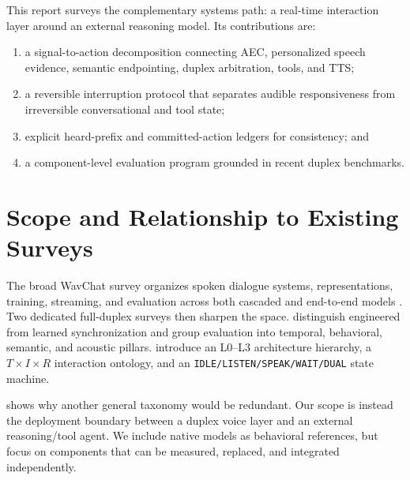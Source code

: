 \documentclass[11pt]{article}
\newcommand{\code}[1]{\texttt{#1}}
\begin{document}
This report surveys the complementary systems path: a real-time interaction
layer around an external reasoning model. Its contributions are:

\begin{enumerate}[leftmargin=*]
  \item a signal-to-action decomposition connecting AEC, personalized speech
        evidence, semantic endpointing, duplex arbitration, tools, and TTS;
  \item a reversible interruption protocol that separates audible responsiveness
        from irreversible conversational and tool state;
  \item explicit heard-prefix and committed-action ledgers for consistency; and
  \item a component-level evaluation program grounded in recent duplex
        benchmarks.
\end{enumerate}

\section{Scope and Relationship to Existing Surveys}

The broad WavChat survey organizes spoken dialogue systems, representations,
training, streaming, and evaluation across both cascaded and end-to-end models
\citep{ji2024wavchat}. Two dedicated full-duplex surveys then sharpen the
space. \citet{chen2025fdsurvey} distinguish engineered from learned
synchronization and group evaluation into temporal, behavioral, semantic, and
acoustic pillars. \citet{lu2026fdsurvey} introduce an L0--L3 architecture
hierarchy, a $T\times I\times R$ interaction ontology, and an
\code{IDLE/LISTEN/SPEAK/WAIT/DUAL} state machine.

 shows why another general taxonomy would be redundant. Our
scope is instead the deployment boundary between a duplex voice layer and an
external reasoning/tool agent. We include native models as behavioral
references, but focus on components that can be measured, replaced, and
integrated independently.
\end{document}
